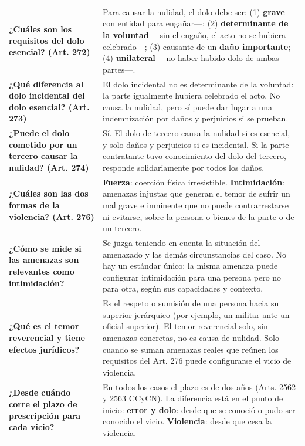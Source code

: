 \documentclass[12pt,oneside]{book}
\begin{document}
\begin{table}[H]
\begin{tabularx}{\textwidth}{
    >{\raggedright\arraybackslash}p{}
    >{\raggedright\arraybackslash}X
}
\textbf{¿Cuáles son los requisitos del dolo esencial? (Art. 272)} &
Para causar la nulidad, el dolo debe ser: (1) \textbf{grave} ---con entidad para engañar---; (2) \textbf{determinante de la voluntad} ---sin el engaño, el acto no se hubiera celebrado---; (3) causante de un \textbf{daño importante}; (4) \textbf{unilateral} ---no haber habido dolo de ambas partes---. \\[6pt]

\textbf{¿Qué diferencia al dolo incidental del dolo esencial? (Art. 273)} &
El dolo incidental no es determinante de la voluntad: la parte igualmente hubiera celebrado el acto. No causa la nulidad, pero sí puede dar lugar a una indemnización por daños y perjuicios si se prueban. \\[6pt]

\textbf{¿Puede el dolo cometido por un tercero causar la nulidad? (Art. 274)} &
Sí. El dolo de tercero causa la nulidad si es esencial, y solo daños y perjuicios si es incidental. Si la parte contratante tuvo conocimiento del dolo del tercero, responde solidariamente por todos los daños. \\[6pt]

\textbf{¿Cuáles son las dos formas de la violencia? (Art. 276)} &
\textbf{Fuerza}: coerción física irresistible. \textbf{Intimidación}: amenazas injustas que generan el temor de sufrir un mal grave e inminente que no puede contrarrestarse ni evitarse, sobre la persona o bienes de la parte o de un tercero. \\[6pt]

\textbf{¿Cómo se mide si las amenazas son relevantes como intimidación?} &
Se juzga teniendo en cuenta la situación del amenazado y las demás circunstancias del caso. No hay un estándar único: la misma amenaza puede configurar intimidación para una persona pero no para otra, según sus capacidades y contexto. \\[6pt]

\textbf{¿Qué es el temor reverencial y tiene efectos jurídicos?} &
Es el respeto o sumisión de una persona hacia su superior jerárquico (por ejemplo, un militar ante un oficial superior). El temor reverencial solo, sin amenazas concretas, no es causa de nulidad. Solo cuando se suman amenazas reales que reúnen los requisitos del Art. 276 puede configurarse el vicio de violencia. \\[6pt]

\textbf{¿Desde cuándo corre el plazo de prescripción para cada vicio?} &
En todos los casos el plazo es de dos años (Arts. 2562 y 2563 CCyCN). La diferencia está en el punto de inicio: \textbf{error y dolo}: desde que se conoció o pudo ser conocido el vicio. \textbf{Violencia}: desde que cesa la violencia. \\[6pt]


\end{tabularx}
\end{table}
\end{document}

